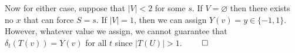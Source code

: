 \documentclass[11pt]{article}
\newcommand{\N}{\mathbb{N}}
\newcommand{\B}{\mathbb{B}}
\let\emptyset\varnothing
\begin{document}
Now for either case, suppose that $|V| < 2$ for some $ s $. If $ V = \emptyset $ then there exists no $ x $ that can force $ S = s $. If $ |V| = 1 $, then we can assign $ Y(v) = y \in \{-1, 1\} $. However, whatever value we assign, we cannot guarantee that $ \delta_{t}(T(v)) = Y(v) $ for all $ t $ since $ |T(U)| > 1 $. $ \hfill \qed $ \\



% 
%
%
%
%


%
%
\end{document}
